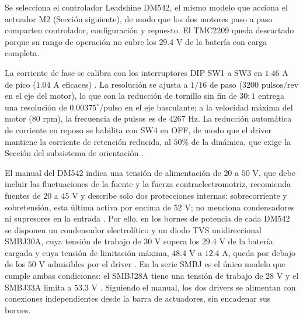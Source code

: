 \documentclass[../../General.tex]{subfiles}
\begin{document}
Se selecciona el controlador Leadshine DM542, el mismo modelo que acciona el actuador M2 (Sección siguiente), de modo que los dos motores paso a paso comparten controlador, configuración y repuesto. El TMC2209 queda descartado porque su rango de operación no cubre los $29.4\text{ V}$ de la batería con carga completa.

La corriente de fase se calibra con los interruptores DIP SW1 a SW3 en $1.46\text{ A}$ de pico ($1.04\text{ A}$ eficaces) \citep{leadshine_dm542}. La resolución se ajusta a $1/16$ de paso ($3200\text{ pulsos/rev}$ en el eje del motor), lo que con la reducción de tornillo sin fin de $30:1$ entrega una resolución de $0.00375^\circ/\text{pulso}$ en el eje basculante; a la velocidad máxima del motor ($80\text{ rpm}$), la frecuencia de pulsos es de $4267\text{ Hz}$. La reducción automática de corriente en reposo se habilita con SW4 en OFF, de modo que el driver mantiene la corriente de retención reducida, al $50\%$ de la dinámica, que exige la Sección del subsistema de orientación \citep{leadshine_dm542}.

El manual del DM542 indica una tensión de alimentación de $20$ a $50\text{ V}$, que debe incluir las fluctuaciones de la fuente y la fuerza contraelectromotriz, recomienda fuentes de $20$ a $45\text{ V}$ y describe solo dos protecciones internas: sobrecorriente y sobretensión, esta última activa por encima de $52\text{ V}$; no menciona condensadores ni supresores en la entrada \citep{leadshine_dm542}. Por ello, en los bornes de potencia de cada DM542 se disponen un condensador electrolítico y un diodo TVS unidireccional SMBJ30A, cuya tensión de trabajo de $30\text{ V}$ supera los $29.4\text{ V}$ de la batería cargada y cuya tensión de limitación máxima, $48.4\text{ V}$ a $12.4\text{ A}$, queda por debajo de los $50\text{ V}$ admisibles por el driver \citep{vishay_smbj}. En la serie SMBJ es el único modelo que cumple ambas condiciones: el SMBJ28A tiene una tensión de trabajo de $28\text{ V}$ y el SMBJ33A limita a $53.3\text{ V}$ \citep{vishay_smbj}. Siguiendo el manual, los dos drivers se alimentan con conexiones independientes desde la barra de actuadores, sin encadenar sus bornes.
\end{document}
